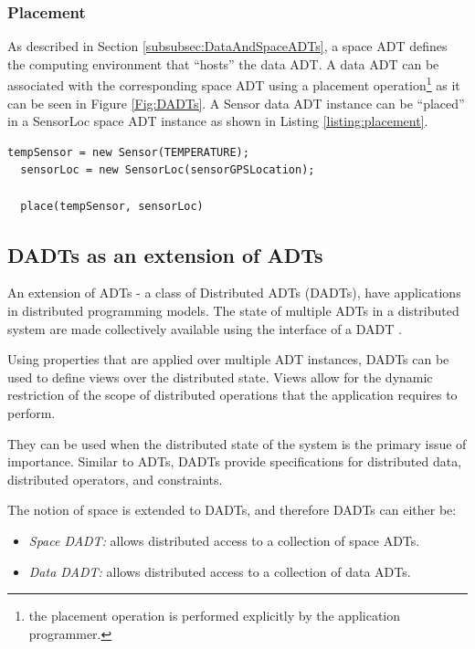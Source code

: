 \subsubsection{Placement}
 
As described in Section \ref{subsubsec:DataAndSpaceADTs}, a space ADT defines
the computing environment that ``hosts'' the data ADT. A data ADT can be
associated with the corresponding space ADT using a placement operation\footnote{the placement operation is
performed explicitly by the application programmer.} as it can be seen in Figure
\ref{Fig:DADTs}. A Sensor data ADT
instance can be ``placed'' in a SensorLoc space ADT instance as shown in Listing
\ref{listing:placement}. 

\begin{lstlisting}[frame=trbl, basewidth={0.55em, 0.6em}, captionpos=b, basicstyle=\ttfamily\footnotesize, breaklines, caption = ADT placement, label = listing:placement ]
  tempSensor = new Sensor(TEMPERATURE);
  sensorLoc = new SensorLoc(sensorGPSLocation);
  
  place(tempSensor, sensorLoc)
\end{lstlisting}

\subsection{DADTs as an extension of ADTs}
An extension of ADTs - a class of Distributed ADTs (DADTs), have applications 
in distributed programming models. The state of multiple ADTs in a distributed
system are made collectively available using the interface of a DADT
\cite{migliavacca_DADT:2006}. 

Using properties that are applied over multiple ADT instances, DADTs can be
used to define views over the distributed state. Views allow for the dynamic
restriction of the scope of distributed operations that the application
requires to perform. 

They can be used when the distributed state 
of the system is the primary issue of importance. Similar to ADTs, DADTs 
provide specifications for distributed data, distributed operators, and 
constraints.

The notion of space is extended to DADTs, and therefore DADTs can either be:

\begin{itemize}
  \item \emph{Space DADT:} allows distributed access to a collection of space
  ADTs. 
  \item \emph{Data DADT:} allows distributed access to a collection of data ADTs.
\end{itemize}

